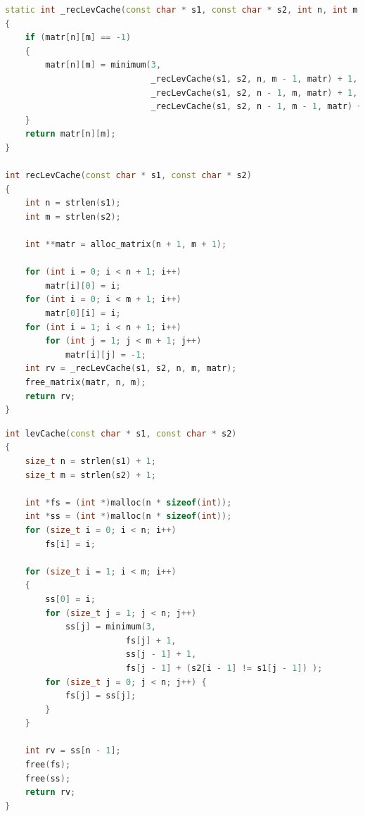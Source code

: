 \documentclass{report}
\begin{document}
\begin{lstlisting}[label=some-code,caption=Функция для рекурсивного нахождения расстояния Левенштейна с кэшем в виде матрицы,language=C++]
static int _recLevCache(const char * s1, const char * s2, int n, int m, int ** matr)
{
    if (matr[n][m] == -1)
    {
        matr[n][m] = minimum(3,
                             _recLevCache(s1, s2, n, m - 1, matr) + 1,
                             _recLevCache(s1, s2, n - 1, m, matr) + 1,
                             _recLevCache(s1, s2, n - 1, m - 1, matr) + (s1[n - 1] != s2[m - 1]));
    }
    return matr[n][m];
}

int recLevCache(const char * s1, const char * s2)
{
    int n = strlen(s1);
    int m = strlen(s2);

    int **matr = alloc_matrix(n + 1, m + 1);

    for (int i = 0; i < n + 1; i++)
        matr[i][0] = i;
    for (int i = 0; i < m + 1; i++)
        matr[0][i] = i;
    for (int i = 1; i < n + 1; i++)
        for (int j = 1; j < m + 1; j++)
            matr[i][j] = -1;
    int rv = _recLevCache(s1, s2, n, m, matr);
    free_matrix(matr, n, m);
    return rv;
}
\end{lstlisting}
\newpage
\begin{lstlisting}[label=some-code,caption=Функция для нерекурсивного нахождения расстояния Левенштейна с кэшем в виде двух строк матрицы,language=C++]
int levCache(const char * s1, const char * s2)
{
    size_t n = strlen(s1) + 1;
    size_t m = strlen(s2) + 1;

    int *fs = (int *)malloc(n * sizeof(int));
    int *ss = (int *)malloc(n * sizeof(int));
    for (size_t i = 0; i < n; i++)
        fs[i] = i;

    for (size_t i = 1; i < m; i++)
    {
        ss[0] = i;
        for (size_t j = 1; j < n; j++)
            ss[j] = minimum(3,
                        fs[j] + 1,
                        ss[j - 1] + 1,
                        fs[j - 1] + (s2[i - 1] != s1[j - 1]) );
        for (size_t j = 0; j < n; j++) {
            fs[j] = ss[j];
        }
    }

    int rv = ss[n - 1];
    free(fs);
    free(ss);
    return rv;
}
\end{lstlisting}
\end{document}
